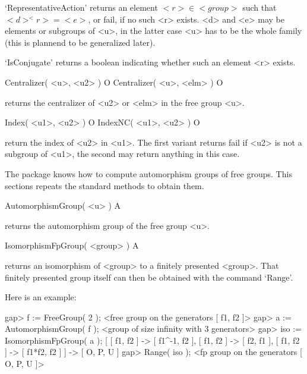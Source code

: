`RepresentativeAction' returns an element $ <r> \in <group> $ such
that $<d>^<r>=<e>$, or fail, if no such <r> exists.  <d> and <e> may
be elements or subgroups of <u>, in the latter case <u> has to be the
whole family (this is plannend to be generalized later).

`IsConjugate' returns a boolean indicating whether such an element <r>
exists.

\>Centralizer( <u>, <u2> ) O
\>Centralizer( <u>, <elm> ) O

returns the centralizer of <u2> or <elm> in the free group <u>.

\>Index( <u1>, <u2> ) O
\>IndexNC( <u1>, <u2> ) O

return the index of <u2> in <u1>.  The first variant returns
fail if <u2> is not a subgroup of <u1>, the second may return
anything in this case.


The {\FGA} package knows how to compute automorphism groups of free
groups. This sections repeats the {\GAP} standard methods to obtain them.

\>AutomorphismGroup( <u> ) A

returns the automorphism group of the free group <u>.

\>IsomorphismFpGroup( <group> ) A

returns an isomorphism of <group> to a finitely presented <group>.  That
finitely presented group itself can then be obtained with the command
`Range'.

Here is an example:

\beginexample
gap> f := FreeGroup( 2 );
<free group on the generators [ f1, f2 ]>
gap> a := AutomorphismGroup( f );
<group of size infinity with 3 generators>
gap> iso := IsomorphismFpGroup( a );
[ [ f1, f2 ] -> [ f1^-1, f2 ], [ f1, f2 ] -> [ f2, f1 ], 
  [ f1, f2 ] -> [ f1*f2, f2 ] ] -> [ O, P, U ]
gap> Range( iso );
<fp group on the generators [ O, P, U ]>
\endexample




